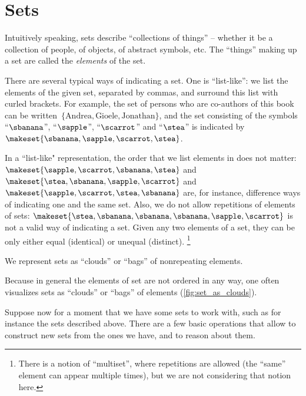 
\section{Sets}

Intuitively speaking, sets describe ``collections of things'' -- whether it be a collection of people, of objects, of abstract symbols, etc.
The ``things'' making up a set are called the \emph{elements} of the set.

There are several typical ways of indicating a set.
One is ``list-like'': we list the elements of the given set, separated by commas, and surround this list with curled brackets.
For example, the set of persons who are co-authors of this book can be written~$\{ \text{Andrea}, \text{Gioele}, \text{Jonathan} \}$, and the set consisting of the symbols ``$\sbanana$'', ``$\sapple$'', ``$\scarrot$'' and ``$\stea$'' is indicated by $\makeset{ \sbanana, \sapple, \scarrot, \stea}$.

In a ``list-like" representation, the order that we list elements in does not matter:
$\makeset{ \sapple, \scarrot, \sbanana, \stea}$ and~$\makeset{ \stea, \sbanana, \sapple, \scarrot}$ and~$\makeset{ \sapple, \scarrot, \stea, \sbanana}$ are, for instance, difference ways of indicating one and the same set.
Also, we do not allow repetitions of elements of sets:
$\makeset{ \stea, \sbanana, \sbanana, \sbanana, \sapple, \scarrot }$ is not a valid way of indicating a set.
Given any two elements of a set, they can be only either equal (identical) or unequal (distinct).
\footnote{There is a notion of ``multiset'', where repetitions are allowed (the ``same'' element can appear multiple times), but we are not considering that notion here.}

\begin{marginfigure}
    \centering
    \caption{We represent sets as ``clouds'' or ``bags'' of nonrepeating elements.}
    \label{fig:set_as_clouds}
\end{marginfigure}

Because in general the elements of set are not ordered in any way, one often visualizes sets as ``clouds'' or ``bags'' of elements (\cref{fig:set_as_clouds}).

Suppose now for a moment that we have some sets to work with, such as for instance the sets described above.
There are a few basic operations that allow to construct new sets from the ones we have, and to reason about them.

